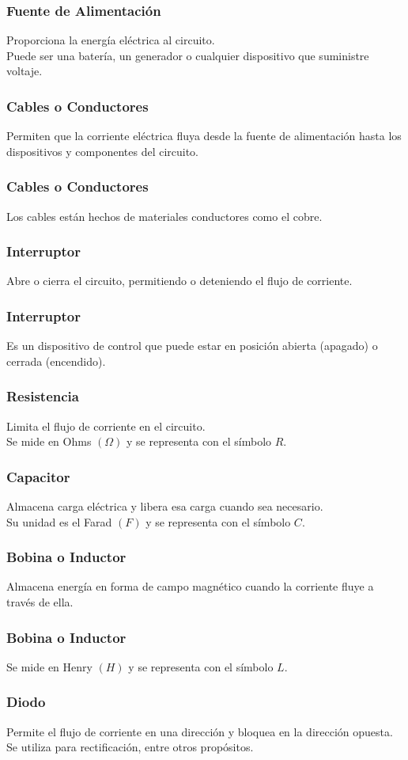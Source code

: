 \documentclass[14pt]{beamer}
\begin{document}
\begin{frame}
\frametitle{Fuente de Alimentación}
Proporciona la energía eléctrica al circuito.
\\
\bigskip
\pause
Puede ser una batería, un generador o cualquier dispositivo que suministre voltaje.
\end{frame}
\begin{frame}
\frametitle{Cables o Conductores}
Permiten que la corriente eléctrica fluya desde la fuente de alimentación hasta los dispositivos y componentes del circuito.
\end{frame}
\begin{frame}
\frametitle{Cables o Conductores}    
Los cables están hechos de materiales conductores como el cobre.
\end{frame}
\begin{frame}
\frametitle{Interruptor}
Abre o cierra el circuito, permitiendo o deteniendo el flujo de corriente.
\end{frame}
\begin{frame}
\frametitle{Interruptor}
Es un dispositivo de control que puede estar en posición abierta (apagado) o cerrada (encendido).
\end{frame}
\begin{frame}
\frametitle{Resistencia}
Limita el flujo de corriente en el circuito.
\\
\bigskip
\pause
Se mide en Ohms $(\Omega)$ y se representa con el símbolo $R$.
\end{frame}
\begin{frame}
\frametitle{Capacitor}
Almacena carga eléctrica y libera esa carga cuando sea necesario.
\\
\bigskip
\pause
Su unidad es el Farad $(F)$ y se representa con el símbolo $C$.
\end{frame}
\begin{frame}
\frametitle{Bobina o Inductor}
Almacena energía en forma de campo magnético cuando la corriente fluye a través de ella.
\end{frame}
\begin{frame}
\frametitle{Bobina o Inductor}
Se mide en Henry $(H)$ y se representa con el símbolo $L$.
\end{frame}
\begin{frame}
\frametitle{Diodo}
Permite el flujo de corriente en una dirección \pause y bloquea en la dirección opuesta.
\\
\bigskip
\pause
Se utiliza para rectificación, entre otros propósitos.
\end{frame}
\end{document}
